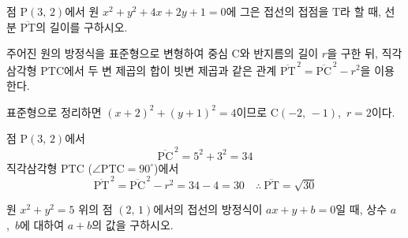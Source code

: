 \documentclass[10pt]{article}
\begin{document}
\newpage


\begin{dmproblem}
점 $\mathrm{P}(3,\, 2)$에서 원 $x^2 + y^2 + 4x + 2y + 1 = 0$에 그은 접선의 접점을 $\mathrm{T}$라 할 때, 선분 $\overline{\mathrm{PT}}$의 길이를 구하시오.
\end{dmproblem}

\begin{dmapproach}
주어진 원의 방정식을 표준형으로 변형하여 중심 $\mathrm{C}$와 반지름의 길이 $r$을 구한 뒤, 직각삼각형 $\mathrm{PTC}$에서 두 변 제곱의 합이 빗변 제곱과 같은 관계 $\overline{\mathrm{PT}}^{\,2} = \overline{\mathrm{PC}}^{\,2} - r^2$을 이용한다.
\end{dmapproach}

\begin{dmsolution}
표준형으로 정리하면 $(x + 2)^2 + (y + 1)^2 = 4$이므로 $\mathrm{C}(-2,\, -1)$,\ $r = 2$이다.

점 $\mathrm{P}(3,\, 2)$에서
\begin{equation*}
  \overline{\mathrm{PC}}^{\,2} = 5^2 + 3^2 = 34
\end{equation*}
직각삼각형 $\mathrm{PTC}$ ($\angle \mathrm{PTC} = 90^{\circ}$)에서
\begin{equation*}
  \overline{\mathrm{PT}}^{\,2} = \overline{\mathrm{PC}}^{\,2} - r^2 = 34 - 4 = 30 \quad \therefore\ \overline{\mathrm{PT}} = \sqrt{30}
\end{equation*}
\end{dmsolution}

\dmchecktitle



\newpage


\begin{dmproblem}
원 $x^2 + y^2 = 5$ 위의 점 $(2,\, 1)$에서의 접선의 방정식이 $ax + y + b = 0$일 때, 상수 $a$,\ $b$에 대하여 $a + b$의 값을 구하시오.
\end{dmproblem}
\end{document}
